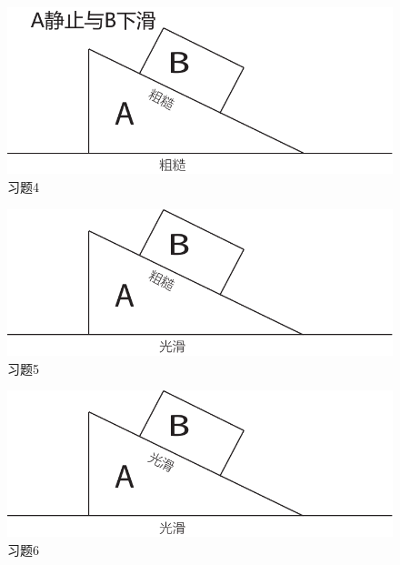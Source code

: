 \documentclass[a4paper, 11pt, oneside]{article}
\begin{document}
\begin{figure}[!h]
\center
\includegraphics[scale=0.8]{./asset/force_analysis_4.pdf}
\caption{习题4}
\end{figure}
\begin{figure}[!h]
\center
\includegraphics[scale=0.8]{./asset/force_analysis_5.pdf}
\caption{习题5}
\end{figure}
\begin{figure}[!h]
\center
\includegraphics[scale=0.8]{./asset/force_analysis_6.pdf}
\caption{习题6}
\end{figure}
\end{document}
